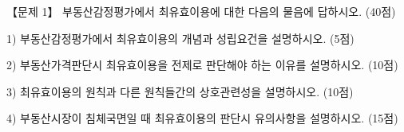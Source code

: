 \begin{longquestion}{【문제 1】}
부동산감정평가에서 최유효이용에 대한 다음의 물음에 답하시오. (40점) \par
1) 부동산감정평가에서 최유효이용의 개념과 성립요건을 설명하시오. (5점) \par
2) 부동산가격판단시 최유효이용을 전제로 판단해야 하는 이유를 설명하시오. (10점) \par
3) 최유효이용의 원칙과 다른 원칙들간의 상호관련성을 설명하시오. (10점) \par
4) 부동산시장이 침체국면일 때 최유효이용의 판단시 유의사항을 설명하시오. (15점) \par
\end{longquestion}
